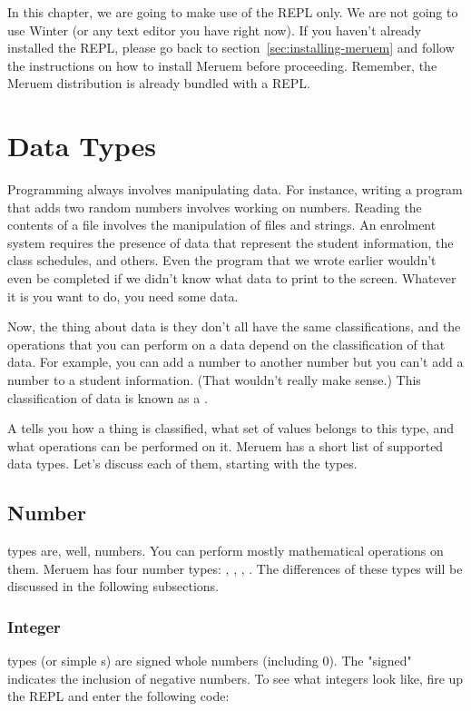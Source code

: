 In this chapter, we are going to make use of the REPL only. We are not going to use Winter (or any text editor you have right now). If you haven't already installed the REPL, please go back to section~\ref{sec:installing-meruem} and follow the instructions on how to install Meruem before proceeding. Remember, the Meruem distribution is already bundled with a REPL.

\section{Data Types}
Programming always involves manipulating data. For instance, writing a program that adds two random numbers involves working on numbers. Reading the contents of a file involves the manipulation of files and strings. An enrolment system requires the presence of data that represent the student information, the class schedules, and others. Even the  program that we wrote earlier wouldn't even be completed if we didn't know what data to print to the screen. Whatever it is you want to do, you need some data.

Now, the thing about data is they don't all have the same classifications, and the operations that you can perform on a data depend on the classification of that data. For example, you can add a number to another number but you can't add a number to a student information. (That wouldn't really make sense.) This classification of data is known as a .

A  tells you how a thing is classified, what set of values belongs to this type, and what operations can be performed on it. Meruem has a short list of supported data types. Let's discuss each of them, starting with the  types.

\subsection{Number}
 types are, well, numbers. You can perform mostly mathematical operations on them. Meruem has four number types: , , , . The differences of these types will be discussed in the following subsections.

\subsubsection{Integer}
 types (or simple s) are signed whole numbers (including 0). The "signed" indicates the inclusion of negative numbers. To see what integers look like, fire up the REPL and enter the following code:

